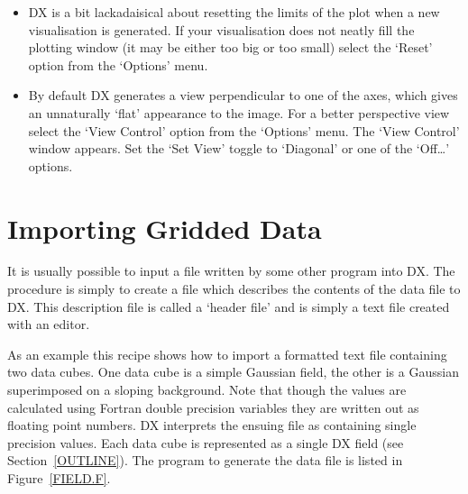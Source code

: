 \documentclass[twoside,11pt]{starlink}
\begin{document}
\begin{enumerate}
  \begin{itemize}

    \item DX is a bit lackadaisical about resetting the limits of the
     plot when a new visualisation is generated. If your visualisation
     does not neatly fill the plotting window (it may be either too big
     or too small) select the `Reset' option from the `Options' menu.

    \item By default DX generates a view perpendicular to one of the
     axes, which gives an unnaturally `flat' appearance to the image.
     For a better perspective view select the `View Control' option
     from the `Options' menu. The `View Control' window appears. Set the
     `Set View' toggle to `Diagonal' or one of the `Off\ldots' options.

  \end{itemize}

\end{enumerate}


\newpage
\section{\label{IMP_GRID}Importing Gridded Data}


It is usually possible to input a file written by some other program
into DX. The procedure is simply to create a file which describes the
contents of the data file to DX. This description file is called a
`header file' and is simply a text file created with an editor.

As an example this recipe shows how to import a formatted text file
containing two data cubes. One data cube is a simple Gaussian field,
the other is a Gaussian superimposed on a sloping background. Note that
though the values are calculated using Fortran double precision
variables they are written out as floating point numbers. DX interprets the
ensuing file as containing single precision values. Each data cube is
represented as a single DX field (see Section~\ref{OUTLINE}).
The program to generate the data file is listed in Figure~\ref{FIELD.F}.
\end{document}
